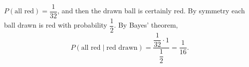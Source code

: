 $P(\text{all red})=\dfrac{1}{32}$, and then the drawn ball is certainly red. By symmetry each ball drawn is red with probability $\dfrac{1}{2}$. By Bayes' theorem,
\[
P(\text{all red}\mid\text{red drawn})=\dfrac{\dfrac{1}{32}\cdot1}{\dfrac{1}{2}}=\boxed{\dfrac{1}{16}}.
\]
